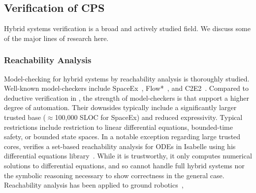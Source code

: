 \documentclass[12pt]{cmuthesis}
\theoremstyle{definition}
\theoremstyle{remark}
\begin{document}
\subsection{Verification of CPS}
%
Hybrid systems verification is a broad and actively studied field.
We discuss some of the major lines of research here.

%
%

\subsubsection{Reachability Analysis}
Model-checking for hybrid systems by reachability analysis is thoroughly studied.
Well-known model-checkers include SpaceEx~\cite{DBLP:conf/cav/FrehseGDCRLRGDM11}, Flow*~\cite{DBLP:conf/cav/ChenAS13}, and C2E2~\cite{DBLP:conf/tacas/DuggiralaMVP15}.
Compared to deductive verification in \dL, the strength of model-checkers is that support a higher degree of automation.
Their downsides typically include a significantly larger trusted base (${\approx}$100,000 SLOC for SpaceEx) and reduced expressivity.
Typical restrictions include restriction to linear differential equations, bounded-time safety, or bounded state spaces.
In a notable exception regarding large trusted cores, \cite{DBLP:conf/tacas/Immler15} verifies a set-based reachability analysis for ODEs in Isabelle using his differential equations library~\cite{DBLP:conf/itp/ImmlerT16}.
While it is trustworthy, it only computes numerical solutions to differential equations, and so cannot handle full hybrid systems nor the symbolic reasoning necessary to show correctness in the general case.
Reachability analysis has been applied to ground robotics~\cite{chen2015benchmark},
\end{document}

